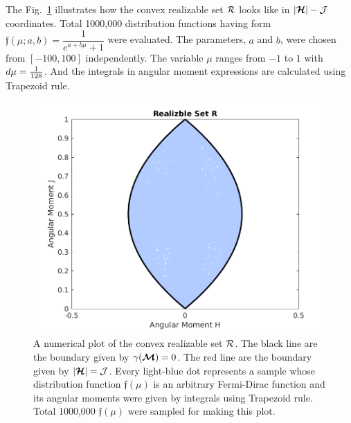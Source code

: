 The Fig.~\ref{fig:RealizableSetFermionic} illustrates how the convex realizable set $\cR$ looks like in $|\boldsymbol{\mathcal{H}}| - \mathcal{J}$ coordinates.
Total 1000,000 distribution functions having form $\mathfrak{f}(\mu;a,b) = \dfrac{1}{e^{a+b\mu}+1}$ were evaluated.
The parameters, $a$ and $b$, were chosen from $[-100,100]$ independently.
The variable $\mu$ ranges from $-1$ to $1$ with $d\mu=\frac{1}{128}$.
And the integrals in angular moment expressions are calculated using Trapezoid rule.
\begin{figure}
\centering
\includegraphics[width=1.0\linewidth]{figures/RealizableSetFermionic}
\caption[Numerical plot of the convex realizable set $\cR$.]{
A numerical plot of the convex realizable set $\cR$.
The black line are the boundary given by $\gamma(\boldsymbol{\mathcal{M}}) = 0$. 
The red line are the boundary given by $|\boldsymbol{\mathcal{H}}| = \mathcal{J}$.
Every light-blue dot represents a sample whose distribution function $\mathfrak{f}(\mu)$ is an arbitrary Fermi-Dirac function and its angular moments were given by integrals using Trapezoid rule.
Total 1000,000 $\mathfrak{f}(\mu)$ were sampled for making this plot.}
\label{fig:RealizableSetFermionic}
\end{figure}

